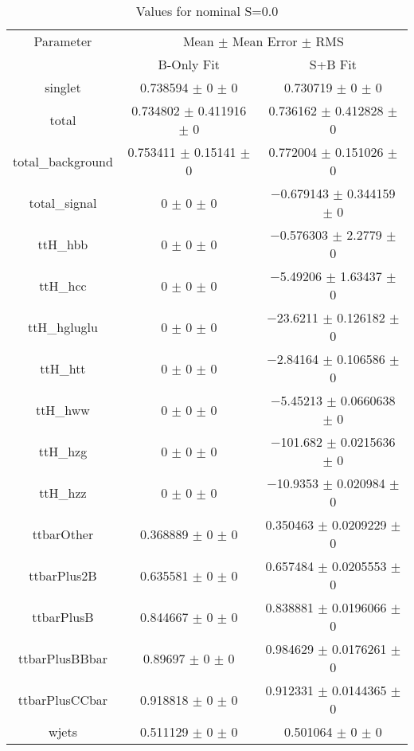 \begin{table}
\centering
\caption{Values for nominal S=0.0}
\begin{tabular}{ccc}
\toprule
Parameter & \multicolumn{2}{c}{Mean $\pm$ Mean Error $\pm$ RMS}\\
 & B-Only Fit & S+B Fit\\
\midrule
singlet & \num{0.738594} $\pm$ \num{0} $\pm$ \num{0} & \num{0.730719} $\pm$ \num{0} $\pm$ \num{0}\\
total & \num{0.734802} $\pm$ \num{0.411916} $\pm$ \num{0} & \num{0.736162} $\pm$ \num{0.412828} $\pm$ \num{0}\\
total\_background & \num{0.753411} $\pm$ \num{0.15141} $\pm$ \num{0} & \num{0.772004} $\pm$ \num{0.151026} $\pm$ \num{0}\\
total\_signal & \num{0} $\pm$ \num{0} $\pm$ \num{0} & \num{-0.679143} $\pm$ \num{0.344159} $\pm$ \num{0}\\
ttH\_hbb & \num{0} $\pm$ \num{0} $\pm$ \num{0} & \num{-0.576303} $\pm$ \num{2.2779} $\pm$ \num{0}\\
ttH\_hcc & \num{0} $\pm$ \num{0} $\pm$ \num{0} & \num{-5.49206} $\pm$ \num{1.63437} $\pm$ \num{0}\\
ttH\_hgluglu & \num{0} $\pm$ \num{0} $\pm$ \num{0} & \num{-23.6211} $\pm$ \num{0.126182} $\pm$ \num{0}\\
ttH\_htt & \num{0} $\pm$ \num{0} $\pm$ \num{0} & \num{-2.84164} $\pm$ \num{0.106586} $\pm$ \num{0}\\
ttH\_hww & \num{0} $\pm$ \num{0} $\pm$ \num{0} & \num{-5.45213} $\pm$ \num{0.0660638} $\pm$ \num{0}\\
ttH\_hzg & \num{0} $\pm$ \num{0} $\pm$ \num{0} & \num{-101.682} $\pm$ \num{0.0215636} $\pm$ \num{0}\\
ttH\_hzz & \num{0} $\pm$ \num{0} $\pm$ \num{0} & \num{-10.9353} $\pm$ \num{0.020984} $\pm$ \num{0}\\
ttbarOther & \num{0.368889} $\pm$ \num{0} $\pm$ \num{0} & \num{0.350463} $\pm$ \num{0.0209229} $\pm$ \num{0}\\
ttbarPlus2B & \num{0.635581} $\pm$ \num{0} $\pm$ \num{0} & \num{0.657484} $\pm$ \num{0.0205553} $\pm$ \num{0}\\
ttbarPlusB & \num{0.844667} $\pm$ \num{0} $\pm$ \num{0} & \num{0.838881} $\pm$ \num{0.0196066} $\pm$ \num{0}\\
ttbarPlusBBbar & \num{0.89697} $\pm$ \num{0} $\pm$ \num{0} & \num{0.984629} $\pm$ \num{0.0176261} $\pm$ \num{0}\\
ttbarPlusCCbar & \num{0.918818} $\pm$ \num{0} $\pm$ \num{0} & \num{0.912331} $\pm$ \num{0.0144365} $\pm$ \num{0}\\
wjets & \num{0.511129} $\pm$ \num{0} $\pm$ \num{0} & \num{0.501064} $\pm$ \num{0} $\pm$ \num{0}\\
\bottomrule
\end{tabular}
\end{table}